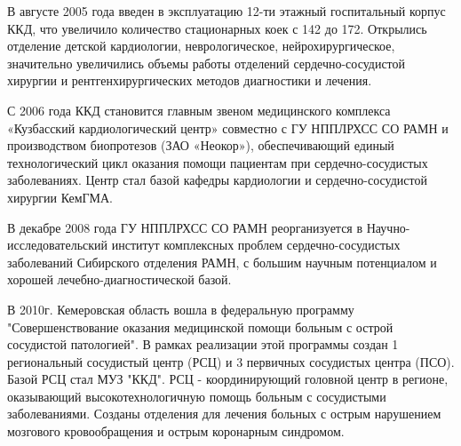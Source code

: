 В августе 2005 года введен в эксплуатацию 12-ти этажный госпитальный корпус ККД,
что увеличило количество стационарных коек с 142 до 172. Открылись отделение
детской кардиологии, неврологическое, нейрохирургическое, значительно
увеличились объемы работы отделений сердечно-сосудистой хирургии и
рентгенхирургических методов диагностики и лечения.

С 2006 года ККД становится главным звеном медицинского комплекса «Кузбасский
кардиологический центр» совместно с ГУ НППЛРХСС СО РАМН и производством
биопротезов (ЗАО «Неокор»), обеспечивающий единый технологический цикл оказания
помощи пациентам при сердечно-сосудистых заболеваниях. Центр стал базой кафедры
кардиологии и сердечно-сосудистой хирургии КемГМА.

В декабре 2008 года ГУ НППЛРХСС СО РАМН реорганизуется в
Научно-исследовательский институт комплексных проблем сердечно-сосудистых
заболеваний Сибирского отделения РАМН, с большим научным потенциалом и хорошей
лечебно-диагностической базой.

В 2010г. Кемеровская область вошла в федеральную программу "Совершенствование
оказания медицинской помощи больным с острой сосудистой патологией". В рамках
реализации этой программы создан 1 региональный сосудистый центр (РСЦ) и 3
первичных сосудистых центра (ПСО). Базой РСЦ стал МУЗ "ККД". РСЦ -
координирующий головной центр в  регионе, оказывающий высокотехнологичную помощь
больным с сосудистыми заболеваниями. Созданы отделения для лечения больных с
острым нарушением мозгового кровообращения и острым коронарным синдромом.